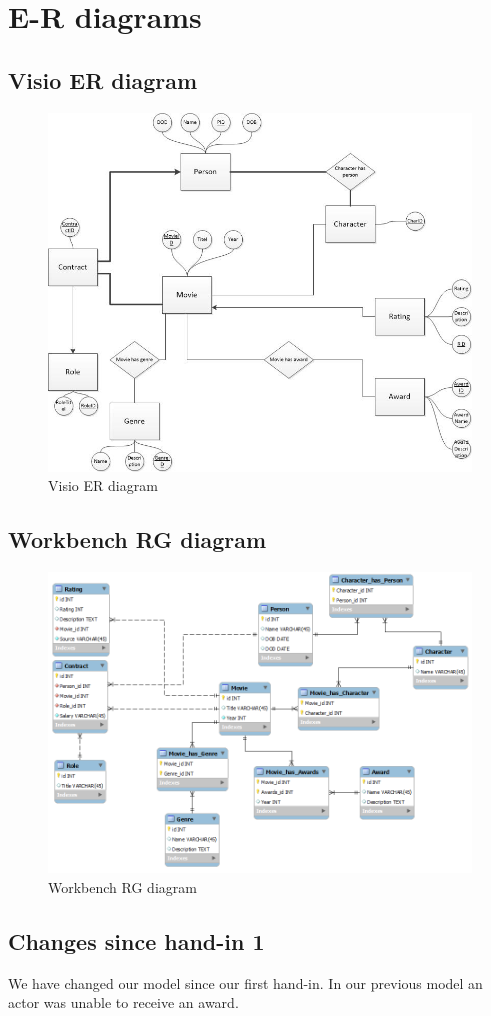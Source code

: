 \section{E-R diagrams}
\subsection{Visio ER diagram}
\begin{figure}[h!]
\includegraphics[width=\textwidth,natwidth=825,natheight=699]{illustrations/ER.jpg}
  \caption{Visio ER diagram}
\end{figure}
\subsection{Workbench RG diagram}
\begin{figure}[h!]
\includegraphics[width=\textwidth,natwidth=940,natheight=670]{illustrations/RG.png}
  \caption{Workbench RG diagram}
\end{figure}
\subsection{Changes since hand-in 1}
We have changed our model since our first hand-in. In our previous model an actor was unable to receive an award.

\newpage
